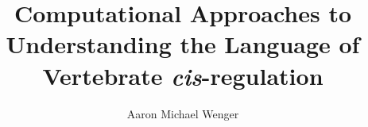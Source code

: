 \documentclass[12pt]{report}
\begin{document}
    \title{Computational Approaches to Understanding the Language of Vertebrate \emph{cis}-regulation}
    \author{Aaron Michael Wenger}

    \beforepreface
    

    
    \afterpreface

    
    
    
    
    
 
    \appendix
    
    

    
    

%
\end{document}
